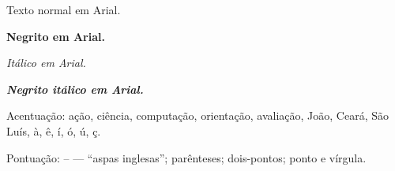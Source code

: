 \documentclass[12pt]{article}
\begin{document}
Texto normal em Arial.

\textbf{Negrito em Arial.}

\textit{Itálico em Arial.}

\textbf{\textit{Negrito itálico em Arial.}}

Acentuação: ação, ciência, computação, orientação, avaliação, João, Ceará, São Luís, à, ê, í, ó, ú, ç.

Pontuação: -- --- ``aspas inglesas''; parênteses; dois-pontos; ponto e vírgula.
\end{document}
